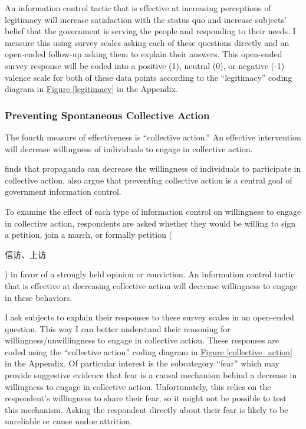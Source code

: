 \documentclass[11pt]{article}
\newcommand{\zh}[1]{\begin{CJK*}{UTF8}{gbsn}#1\end{CJK*}}
\begin{document}
An information control tactic that is effective at increasing perceptions of legitimacy will increase satisfaction with the status quo and increase subjects' belief that the government is serving the people and responding to their needs. I measure this using survey scales asking each of these questions directly and an open-ended follow-up asking them to explain their answers. This open-ended survey response will be coded into a positive (1), neutral (0), or negative (-1) valence scale for both of these data points according to the ``legitimacy'' coding diagram in \hyperref[legitimacy]{Figure \ref*{legitimacy}} in the Appendix.

\subsubsection{Preventing Spontaneous Collective Action}

The fourth measure of effectiveness is ``collective action.'' An effective intervention will decrease willingness of individuals to engage in collective action.

\cite{huang2014propaganda} finds that propaganda can decrease the willingness of individuals to participate in collective action. \cite{king2013censorship,king2014reverse} also argue that preventing collective action is a central goal of government information control.

To examine the effect of each type of information control on willingness to engage in collective action, respondents are asked whether they would be willing to sign a petition,  join a march, or formally petition (\zh{信访、上访}) in favor of a strongly held opinion or conviction. An information control tactic that is effective at decreasing collective action will decrease willingness to engage in these behaviors.

I ask subjects to explain their responses to these survey scales in an open-ended question. This way I can better understand their reasoning for willingness/unwillingness to engage in collective action. These responses are coded using the ``collective action'' coding diagram in \hyperref[collective_action]{Figure \ref*{collective_action}} in the Appendix. Of particular interest is the subcategory ``fear'' which may provide suggestive evidence that fear is a causal mechanism behind a decrease in willingness to engage in collective action. Unfortunately, this relies on the respondent's willingness to share their fear, so it might not be possible to test this mechanism. Asking the respondent directly about their fear is likely to be unreliable or cause undue attrition.
\end{document}
